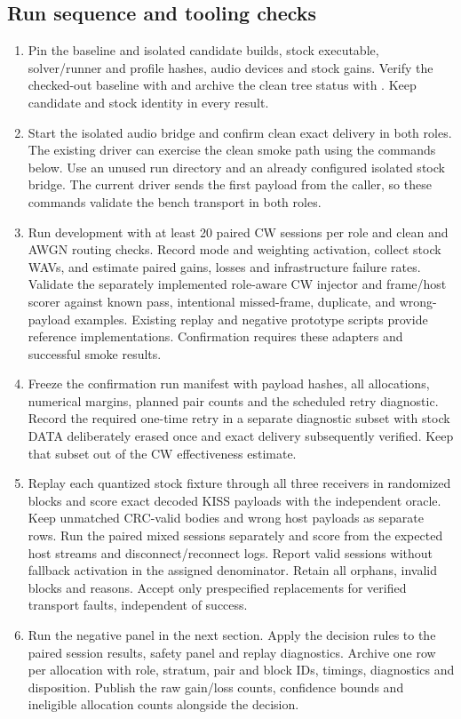 \documentclass[11pt,a4paper]{article}
\begin{document}
\subsection{Run sequence and tooling checks}
\begin{enumerate}
\item Pin the baseline and isolated candidate builds, stock executable, solver/runner and profile hashes, audio devices and stock gains. Verify the checked-out baseline with  and archive the clean tree status with . Keep candidate and stock identity in every result.
\item Start the isolated audio bridge and confirm clean exact delivery in both roles. The existing driver can exercise the clean smoke path using the commands below. Use an unused run directory and an already configured isolated stock bridge. The current driver sends the first payload from the caller, so these commands validate the bench transport in both roles.
\item Run development with at least 20 paired CW sessions per role and clean and AWGN routing checks. Record mode and weighting activation, collect stock WAVs, and estimate paired gains, losses and infrastructure failure rates. Validate the separately implemented role-aware CW injector and frame/host scorer against known pass, intentional missed-frame, duplicate, and wrong-payload examples. Existing replay and negative prototype scripts provide reference implementations. Confirmation requires these adapters and successful smoke results.
\item Freeze the confirmation run manifest with payload hashes, all allocations, numerical margins, planned pair counts and the scheduled retry diagnostic. Record the required one-time retry in a separate diagnostic subset with stock DATA deliberately erased once and exact delivery subsequently verified. Keep that subset out of the CW effectiveness estimate.
\item Replay each quantized stock fixture through all three receivers in randomized blocks and score exact decoded KISS payloads with the independent oracle. Keep unmatched CRC-valid bodies and wrong host payloads as separate rows. Run the paired mixed sessions separately and score from the expected host streams and disconnect/reconnect logs. Report valid sessions without fallback activation in the assigned denominator. Retain all orphans, invalid blocks and reasons. Accept only prespecified replacements for verified transport faults, independent of success.
\item Run the negative panel in the next section. Apply the decision rules to the paired session results, safety panel and replay diagnostics. Archive one row per allocation with role, stratum, pair and block IDs, timings, diagnostics and disposition. Publish the raw gain/loss counts, confidence bounds and ineligible allocation counts alongside the decision.
\end{enumerate}
\end{document}

